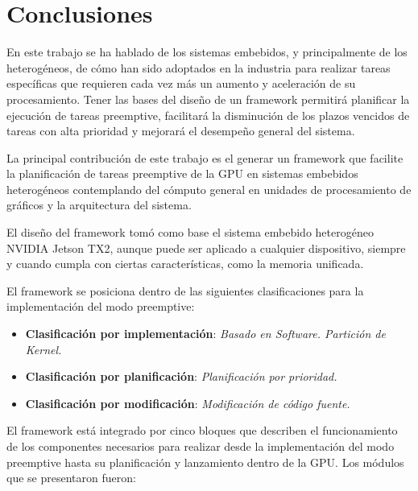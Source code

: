 \chapter{Conclusiones}
    \label{cha:Conclusiones}
    
En este trabajo se ha hablado de los sistemas embebidos, y principalmente de los heterogéneos, de cómo han sido adoptados en la industria para realizar tareas específicas que requieren cada vez más un aumento y aceleración de su procesamiento.
Tener las bases del diseño de un framework permitirá planificar la ejecución de tareas preemptive, facilitará la disminución de los plazos vencidos de tareas con alta prioridad y mejorará el desempeño general del sistema.
\newline

La principal contribución de este trabajo es el generar un framework que facilite la planificación de tareas preemptive de la GPU en sistemas embebidos heterogéneos contemplando del cómputo general en unidades de procesamiento de gráficos y la arquitectura del sistema.
\newline

El diseño del framework tomó como base el sistema embebido heterogéneo NVIDIA Jetson TX2, aunque puede ser aplicado a cualquier dispositivo, siempre y cuando cumpla con ciertas características, como la memoria unificada.
\newline

El framework se posiciona dentro de las siguientes clasificaciones para la implementación del modo preemptive:
\begin{itemize}
    \item \textbf{Clasificación por implementación}: \textit{Basado en Software. Partición de Kernel.}
    \item \textbf{Clasificación por planificación}: \textit{Planificación por prioridad.}
    \item \textbf{Clasificación por modificación}: \textit{Modificación de código fuente.}
\end{itemize}
    
El framework está integrado por cinco bloques que describen el funcionamiento de los componentes necesarios para realizar desde la implementación del modo preemptive hasta su planificación y lanzamiento dentro de la GPU. 
Los módulos que se presentaron fueron:

